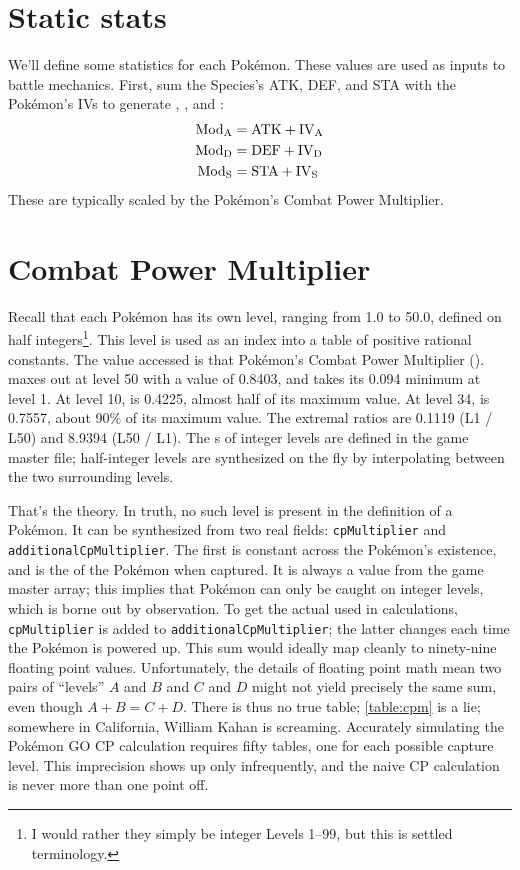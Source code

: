\section{Static stats\label{sec:staticstats}}
We'll define some statistics for each Pokémon.
These values are used as inputs to battle mechanics.
First, sum the Species's ATK, DEF, and STA with the Pokémon's
IVs to generate , , and :
\begin{align*}
 \mbox{$\text{Mod}_\text{A}$} &= \mathrm{ATK} + \mathit{\mbox{$\text{IV}_\text{A}$}} \\
 \mbox{$\text{Mod}_\text{D}$} &= \mathrm{DEF} + \mathit{\mbox{$\text{IV}_\text{D}$}} \\
 \mbox{$\text{Mod}_\text{S}$} &= \mathrm{STA} + \mathit{\mbox{$\text{IV}_\text{S}$}}
\end{align*}
These are typically scaled by the Pokémon's Combat Power Multiplier.
\section{Combat Power Multiplier\label{sec:cpm}}
Recall that each Pokémon has its own level, ranging from 1.0
 to 50.0, defined on half integers\footnote{I would rather they
 simply be integer Levels 1--99, but this is settled terminology.}.
This level is used as an index into a table of positive rational constants.
The value accessed is that Pokémon's Combat Power Multiplier (\CPM).
\CPM{} maxes out at level 50 with a value of 0.8403, and takes its 0.094 minimum at level 1.
At level 10, \CPM{} is 0.4225, almost half of its maximum value.
At level 34, \CPM{} is 0.7557, about 90\% of its maximum value.
The extremal ratios are 0.1119 (L1 / L50) and 8.9394 (L50 / L1).
The \CPM{}s of integer levels are defined in the game master file; half-integer levels
 are synthesized on the fly by interpolating between the two surrounding levels.

That's the theory.
In truth, no such level is present in the definition of a Pokémon.
It can be synthesized from two real fields: \texttt{cpMultiplier} and \texttt{additionalCpMultiplier}.
The first is constant across the Pokémon's existence, and is the \CPM{} of the Pokémon when captured.
It is always a value from the game master array; this implies that Pokémon can only be caught on integer levels,
 which is borne out by observation.
To get the actual \CPM{} used in calculations, \texttt{cpMultiplier} is added to \texttt{additionalCpMultiplier}; the
 latter changes each time the Pokémon is powered up.
This sum would ideally map cleanly to ninety-nine floating point values.
Unfortunately, the details of floating point math mean two pairs of ``levels'' $A$ and $B$
 and $C$ and $D$ might not yield precisely the same sum, even though $A+B = C+D$.
There is thus no true \CPM{} table; \autoref{table:cpm} is a lie; somewhere in
 California, William Kahan is screaming.
Accurately simulating the Pokémon GO CP calculation requires fifty tables, one for each possible capture level.
This imprecision shows up only infrequently, and the naive CP calculation is never more than one point off.

